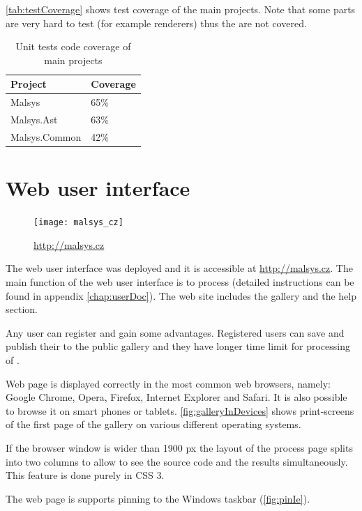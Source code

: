 \autoref{tab:testCoverage} shows test coverage of the main projects.
Note that some parts are very hard to test (for example \lsystem renderers) thus the are not covered.

\begin{table}[h]
	\centering
	\begin{tabular}{l l}
   		\toprule
   		Project & Coverage\\
   		\midrule
		Malsys & 65\% \\ \hline
		Malsys.Ast & 63\% \\ \hline
		Malsys.Common & 42\% \\
		\bottomrule
	\end{tabular}
	\caption{Unit tests code coverage of main projects}
	\label{tab:testCoverage}
\end{table}


\clearpage %
\section{Web user interface}

\begin{figure}
	\texttt{[image: malsys\_cz]}
	\caption[QR code for http://malsys.cz]{\url{http://malsys.cz}}
	\label{fig:malsysQr}
\end{figure}

The web user interface was deployed and it is accessible at \url{http://malsys.cz}.
The main function of the web user interface is to process \lsystems (detailed instructions can be found in appendix \ref{chap:userDoc}).
The web site includes the \lsystem gallery and the help section.

Any user can register and gain some advantages.
Registered users can save and publish their \lsystems to the public gallery and they have longer time limit for processing of \lsystems.

Web page is displayed correctly in the most common web browsers, namely: Google Chrome, Opera, Firefox, Internet Explorer and Safari.
It is also possible to browse it on smart phones or tablets.
\autoref{fig:galleryInDevices} shows print-screens of the first page of the gallery on various different operating systems.

If the browser window is wider than 1900 px the layout of the \lsystem process page splits into two columns to allow to see the source code and the results simultaneously.
This feature is done purely in CSS 3.

The web page is supports pinning to the Windows taskbar (\autoref{fig:pinIe}). 

